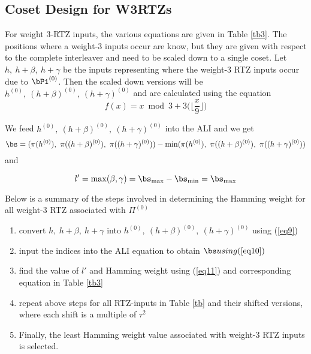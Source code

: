  \subsection{Coset Design for W3RTZs}
 For weight $3$-RTZ inputs, the various equations are given in Table \ref{tb3}. The positions where a weight-$3$ inputs occur are know, but they are given with respect to the complete interleaver and need to be scaled down to a single coset. 
 Let $h,~h+\beta,~h+\gamma$ be the inputs representing where the weight-$3$ RTZ inputs occur due to $\bPi^{(0)}$. Then the scaled down versions will be $h^{(0)},~(h+\beta)^{(0)},~(h+\gamma)^{(0)}$ and are calculated using the equation
 \begin{equation}
 f(x)= x \bmod 3 + 3\Big(\Big\lfloor\frac{x}{9} \Big\rfloor\Big)
 \label{eq9}
 \end{equation}
 
 We feed $h^{(0)},~(h+\beta)^{(0)},~(h+\gamma)^{(0)}$ into the ALI and we get \begin{equation}
 \bs=(\pi(h^{(0)}),~\pi((h+\beta)^{(0)}),~\pi((h+\gamma)^{(0)}))-\min(\pi(h^{(0)}),~\pi((h+\beta)^{(0)}),~\pi((h+\gamma)^{(0)}))
 \label{eq10}
 \end{equation}
  and 
 
 \begin{equation}
 l'=\max(\beta,\gamma)= \bs_{\max}-\bs_{\min}=\bs_{\max}
 \label{eq11}
 \end{equation}
 
 Below is a summary of the steps involved in determining the Hamming weight for all weight-$3$ RTZ associated with $\Pi^{(0)}$ 
 \begin{enumerate}
 \item convert  $h,~h+\beta,~h+\gamma$ into $h^{(0)},~(h+\beta)^{(0)},~(h+\gamma)^{(0)}$ using (\ref{eq9})
 
 \item input the indices into the ALI equation to obtain $\bs using (\ref{eq10})$
 
 \item find the value of $l'$ and  Hamming weight using (\ref{eq11}) and corresponding equation in Table \ref{tb3}
 
 \item repeat above steps for all RTZ-inputs in Table \ref{tb} and their shifted versions, where each shift is a multiple of $\tau^2$
 
\item Finally, the least Hamming weight value associated with weight-$3$ RTZ inputs is selected.
 \end{enumerate}
 
